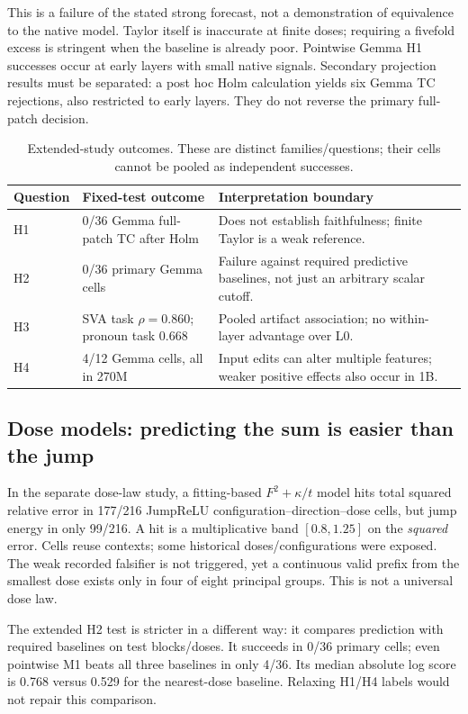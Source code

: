 This is a failure of the stated strong forecast, not a demonstration of equivalence to the native model. Taylor itself is inaccurate at finite doses; requiring a fivefold excess is stringent when the baseline is already poor. Pointwise Gemma H1 successes occur at early layers with small native signals. Secondary projection results must be separated: a post hoc Holm calculation yields six Gemma TC rejections, also restricted to early layers. They do not reverse the primary full-patch decision.

\begin{table}[ht]
\centering\small
\begin{tabular}{p{.19\linewidth}p{.31\linewidth}p{.39\linewidth}}
\toprule Question & Fixed-test outcome & Interpretation boundary\\
\midrule
H1 & 0/36 Gemma full-patch TC after Holm & Does not establish faithfulness; finite Taylor is a weak reference.\\
H2 & 0/36 primary Gemma cells & Failure against required predictive baselines, not just an arbitrary scalar cutoff.\\
H3 & SVA task $\rho=0.860$; pronoun task $0.668$ & Pooled artifact association; no within-layer advantage over L0.\\
H4 & 4/12 Gemma cells, all in 270M & Input edits can alter multiple features; weaker positive effects also occur in 1B.\\
\bottomrule
\end{tabular}
\caption{Extended-study outcomes. These are distinct families/questions; their cells cannot be pooled as independent successes.}
\end{table}

\subsection{Dose models: predicting the sum is easier than the jump}
In the separate dose-law study, a fitting-based $F^2+\kappa/t$ model hits total squared relative error in 177/216 JumpReLU configuration--direction--dose cells, but jump energy in only 99/216. A hit is a multiplicative band $[0.8,1.25]$ on the \emph{squared} error. Cells reuse contexts; some historical doses/configurations were exposed. The weak recorded falsifier is not triggered, yet a continuous valid prefix from the smallest dose exists only in four of eight principal groups. This is not a universal dose law.

The extended H2 test is stricter in a different way: it compares prediction with required baselines on test blocks/doses. It succeeds in 0/36 primary cells; even pointwise M1 beats all three baselines in only 4/36. Its median absolute log score is 0.768 versus 0.529 for the nearest-dose baseline. Relaxing H1/H4 labels would not repair this comparison.

